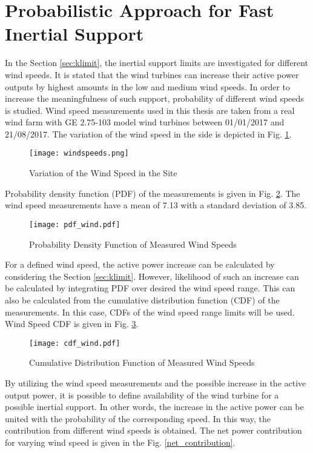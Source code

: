 \section{Probabilistic Approach for Fast Inertial Support}
In the Section \ref{sec:klimit}, the inertial support limits are investigated for different wind speeds. It is stated that the wind turbines can increase their active power outputs by highest amounts in the low and medium wind speeds. In order to increase the meaningfulness of such support, probability of different wind speeds is studied. Wind speed measurements used in this thesis are taken from a real wind farm with GE 2.75-103 model wind turbines between 01/01/2017 and 21/08/2017. The variation of the wind speed in the side is depicted in Fig. \ref{windvariation}.\par
\begin{figure}[h!]
	\centering
	\texttt{[image: windspeeds.png]}
	\caption{Variation of the Wind Speed in the Site}
	\label{windvariation}
\end{figure}
Probability density function (PDF) of the measurements is given in Fig. \ref{windpdf}. The wind speed measurements have a mean of 7.13 with a standard deviation of 3.85.\par
\begin{figure}[h!]
	\centering
	\texttt{[image: pdf\_wind.pdf]}
	\caption{Probability Density Function of Measured Wind Speeds}
	\label{windpdf}
\end{figure}
For a defined wind speed, the active power increase can be calculated by considering the Section \ref{sec:klimit}. However, likelihood of such an increase can be calculated by integrating PDF over desired the wind speed range. This can also be calculated from the cumulative distribution function (CDF) of the measurements. In this case, CDFs of the wind speed range limits will be used. Wind Speed CDF is given in Fig. \ref{windcdf}. \par
\begin{figure}[h!]
	\centering
	\texttt{[image: cdf\_wind.pdf]}
	\caption{Cumulative Distribution Function of Measured Wind Speeds}
	\label{windcdf}
\end{figure}
By utilizing the wind speed measurements and the possible increase in the active output power, it is possible to define availability of the wind turbine for a possible inertial support. In other words, the increase in the active power can be united with the probability of the corresponding speed. In this way, the contribution from different wind speeds is obtained. The net power contribution for varying wind speed is given in the Fig. \ref{net_contribution}.\par
